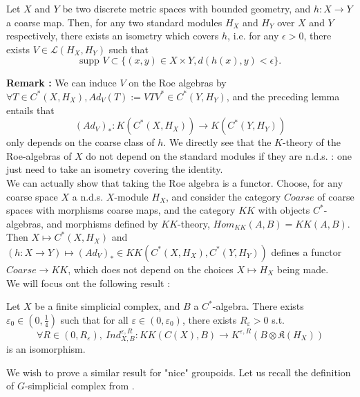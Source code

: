 \begin{lem}
Let $X$ and $Y$ be two discrete metric spaces with bounded geometry, and $h : X\rightarrow Y$ a coarse map. Then, for any two standard modules $H_X$ and $H_Y$ over $X$ and $Y$ respectively, there exists an isometry which covers $h$, i.e. for any $\epsilon >0$, there exists $V\in \mathcal L(H_X,H_Y)$ such that 
\[\text{supp }V \subset \{(x,y)\in X\times Y, d(h(x),y)<\epsilon\}.\]
\end{lem}

\textbf{Remark :} We can induce $V$ on the Roe algebras by $\forall T\in C^*(X,H_X), Ad_V(T) := V T V^* \in C^*(Y,H_Y)$, and the preceding lemma entails that \[(Ad_V)_* : K(C^*(X,H_X))\rightarrow K(C^*(Y,H_Y))\] only depends on the coarse class of $h$. We directly see that the $K$-theory of the Roe-algebras of $X$ do not depend on the standard modules if they are n.d.s. : one just need to take an isometry covering the identity. \\

We can actually show that taking the Roe algebra is a functor. Choose, for any coarse space $X$ a n.d.s. $X$-module $H_X$, and consider the category $Coarse$ of coarse spaces with morphisms coarse maps, and the category $KK$ with objects $C^*$-algebras, and morphisms defined by $KK$-theory, $Hom_{KK}(A,B)=KK(A,B)$. Then $ X \mapsto C^*(X,H_X) $ and $\left(h:X \rightarrow Y\right) \mapsto (Ad_V)_*\in KK(C^*(X,H_X),C^*(Y,H_Y))$ defines a functor $Coarse \rightarrow KK$, which does not depend on the choices $X\mapsto H_X$ being made.\\

We will focus ont the following result :

\begin{thm}
Let $X$ be a finite simplicial complex, and $B$ a $C^*$-algebra. There exists $\varepsilon_0\in (0,\frac{1}{4})$ such that for all $\varepsilon \in (0,\varepsilon_0)$, there exists $R_\varepsilon>0 $ s.t. 
\[\forall R\in (0,R_\varepsilon),\  Ind_{X,B}^{\varepsilon, R} : KK(C(X),B)\rightarrow K^{\varepsilon,R}(B\otimes \mathfrak K(H_X))\] 
is an isomorphism.
\end{thm}

We wish to prove a similar result for "nice" groupoids. Let us recall the definition of $G$-simplicial complex from \cite{TuBC2}.

